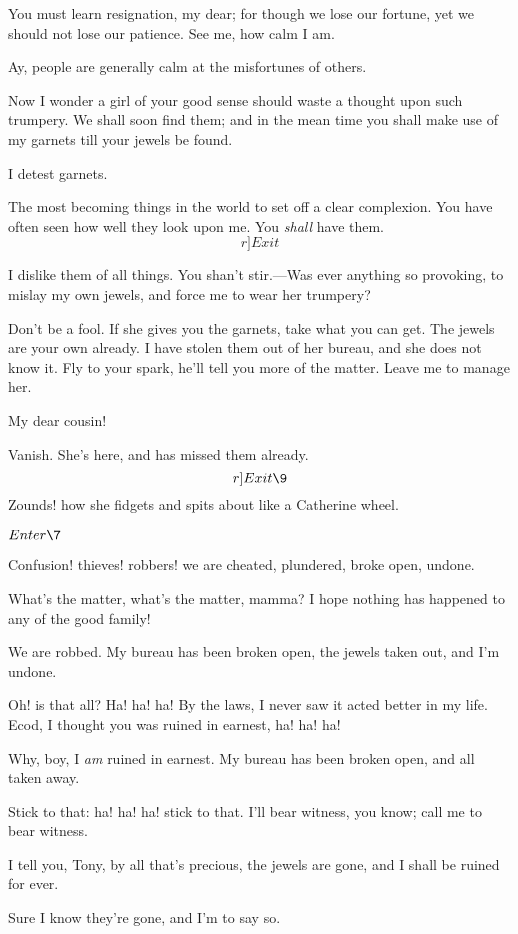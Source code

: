 \documentclass{book}
\begin{document}
\7  You must learn resignation, my dear; for though we
lose our fortune, yet we should not lose our patience.  See me, how
calm I am.

\9  Ay, people are generally calm at the misfortunes of
others.

\7  Now I wonder a girl of your good sense should waste a
thought upon such trumpery.  We shall soon find them; and in the mean
time you shall make use of my garnets till your jewels be found.

\9  I detest garnets.

\7  The most becoming things in the world to set off a
clear complexion.  You have often seen how well they look upon me.  You
\textit{shall} have them.  \[r]Exit\]

\9  I dislike them of all things.  You shan't stir.---Was
ever anything so provoking, to mislay my own jewels, and force me to
wear her trumpery?

\5  Don't be a fool.  If she gives you the garnets, take what you
can get.  The jewels are your own already.  I have stolen them out of
her bureau, and she does not know it.  Fly to your spark, he'll tell
you more of the matter.  Leave me to manage her.

\9  My dear cousin!

\5  Vanish.  She's here, and has missed them already.  \[r]Exit \9\]
Zounds! how she fidgets and spits about like a Catherine wheel.


\(Enter \7\)


\7  Confusion! thieves! robbers! we are cheated,
plundered, broke open, undone.

\5  What's the matter, what's the matter, mamma?  I hope nothing has
happened to any of the good family!

\7  We are robbed.  My bureau has been broken open, the
jewels taken out, and I'm undone.

\5  Oh! is that all?  Ha! ha! ha!  By the laws, I never saw it
acted better in my life.  Ecod, I thought you was ruined in earnest,
ha! ha! ha!

\7  Why, boy, I \textit{am} ruined in earnest.  My bureau has been
broken open, and all taken away.

\5  Stick to that: ha! ha! ha! stick to that.  I'll bear witness,
you know; call me to bear witness.

\7  I tell you, Tony, by all that's precious, the jewels
are gone, and I shall be ruined for ever.

\5  Sure I know they're gone, and I'm to say so.
\end{document}
